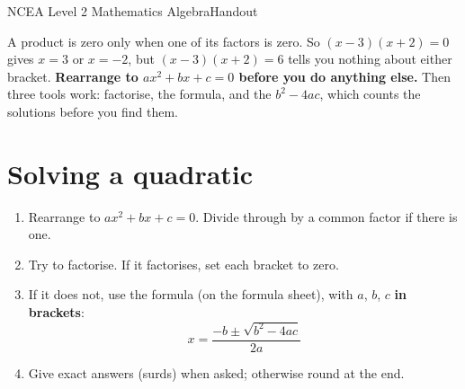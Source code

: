 \documentclass[11pt]{article}
\begin{document}
  {NCEA Level 2 Mathematics \textperiodcentered{} Algebra}{Handout}

\begin{keybox}[title={The one idea: get = 0 first}]
A product is zero only when one of its factors is zero. So $(x-3)(x+2) = 0$ gives $x = 3$ or $x = -2$, but $(x-3)(x+2) = 6$ tells you nothing about either bracket.
\textbf{Rearrange to $ax^{2} + bx + c = 0$ before you do anything else.} Then three tools work: factorise, the formula, and the \Tdisc{} $b^{2} - 4ac$, which counts the solutions before you find them.
\end{keybox}

\section{Solving a quadratic}\label{h3:solve}
\begin{keybox}[title={Write it in this order}]
\begin{enumerate}
\item Rearrange to $ax^{2} + bx + c = 0$. Divide through by a common factor if there is one.
\item Try to factorise. If it factorises, set each bracket to zero.
\item If it does not, use the formula (on the formula sheet), with $a$, $b$, $c$ \textbf{in brackets}:
\[ x = \frac{-b \pm \sqrt{b^{2} - 4ac}}{2a} \]
\item Give exact answers (surds) when asked; otherwise round at the end.
\end{enumerate}
\end{keybox}
\end{document}
